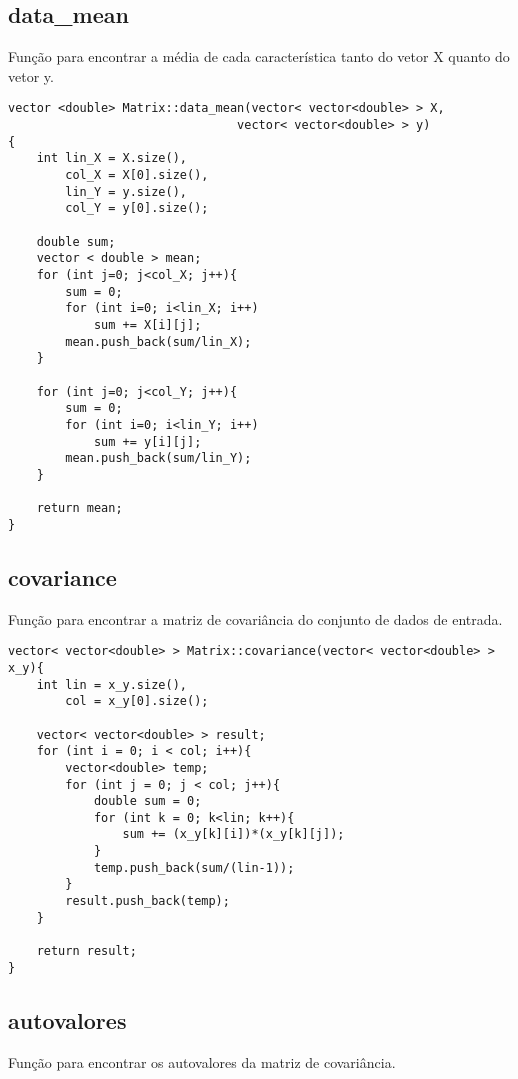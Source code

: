 \documentclass[a4paper, 11pt]{article}
\begin{document}
\subsection*{data\_mean}
Função para encontrar a média de cada característica tanto do vetor X quanto do vetor y.

\begin{lstlisting}
vector <double> Matrix::data_mean(vector< vector<double> > X, 
								vector< vector<double> > y)
{
	int lin_X = X.size(),
		col_X = X[0].size(),
		lin_Y = y.size(),
		col_Y = y[0].size();
	
	double sum;
	vector < double > mean;
	for (int j=0; j<col_X; j++){
		sum = 0;
		for (int i=0; i<lin_X; i++)
			sum += X[i][j];
		mean.push_back(sum/lin_X);
	}

	for (int j=0; j<col_Y; j++){
		sum = 0;
		for (int i=0; i<lin_Y; i++)
			sum += y[i][j];
		mean.push_back(sum/lin_Y);
	}
	
	return mean;
}
\end{lstlisting}

\subsection*{covariance}
Função para encontrar a matriz de covariância do conjunto de dados de entrada.

\begin{lstlisting}
vector< vector<double> > Matrix::covariance(vector< vector<double> > x_y){
	int lin = x_y.size(),
		col = x_y[0].size();
	
	vector< vector<double> > result;
	for (int i = 0; i < col; i++){
		vector<double> temp;
        for (int j = 0; j < col; j++){
        	double sum = 0;
        	for (int k = 0; k<lin; k++){
        		sum += (x_y[k][i])*(x_y[k][j]);
			}
			temp.push_back(sum/(lin-1));
        }
        result.push_back(temp);
    }
    
    return result;
}
\end{lstlisting}

\subsection*{autovalores}
Função para encontrar os autovalores da matriz de covariância.
\end{document}
